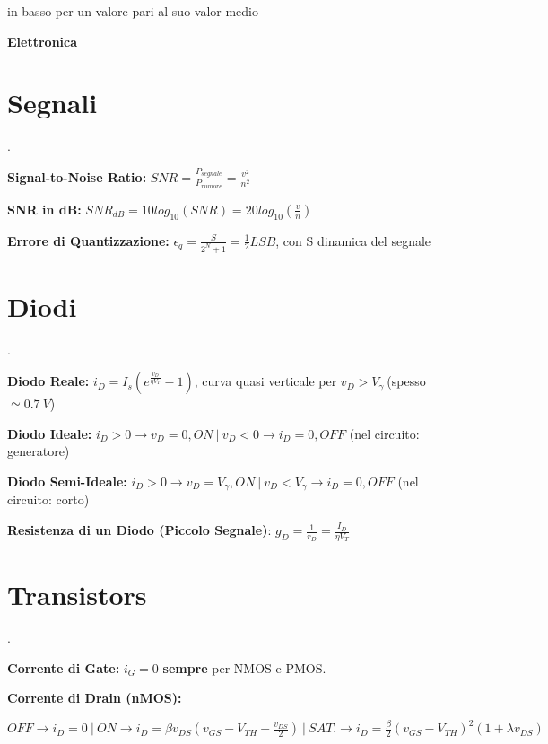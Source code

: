 \documentclass[12pt]{extarticle}
\begin{document}
in basso per un valore pari al suo valor medio


\newpage

{\bf \Huge Elettronica}
\setcounter{section}{0}
\section{Segnali}.


{\bf Signal-to-Noise Ratio:} $\displaystyle SNR = \frac{P_{segnale}}{P_{rumore}} = \frac{v^2}{n^2}$ 

{\bf SNR in dB:} $\displaystyle SNR_{dB} = 10log_{10}(SNR) = 20log_{10}(\frac{v}{n})$

{\bf Errore di Quantizzazione:} $\displaystyle \epsilon_q = \frac{S}{2^N+1} = \frac{1}{2}LSB $, con S dinamica del segnale

\section{Diodi}.

{\bf Diodo Reale:} $\displaystyle i_D = I_s(e^{\frac{v_D}{\eta V_T}}- 1)$, curva quasi verticale per $ v_D > V_\gamma \ $(spesso $\simeq 0.7 \ V $)$ $

{\bf Diodo Ideale:} $i_D > 0 \to v_D = 0, ON \ \big | \ v_D < 0 \to i_D = 0, OFF $ (nel circuito: generatore)

{\bf Diodo Semi-Ideale:} $i_D > 0 \to v_D = V_\gamma, ON \ \big | \ v_D < V_\gamma \to i_D = 0, OFF$ (nel circuito: corto)

{\bf Resistenza di un Diodo (Piccolo Segnale)}: $\displaystyle g_D = \frac{1}{r_D} = \frac{I_D}{\eta V_T}$

\section{Transistors}.

{\bf Corrente di Gate:} $i_G = 0$ {\bf sempre} per NMOS e PMOS.

{\bf Corrente di Drain (nMOS):} 

$\displaystyle OFF \to i_D = 0 \ \big | \  ON \to i_D = \beta v_{DS}(v_{GS}-V_{TH}-\frac{v_{DS}}{2}) \ \big | \ SAT. \to i_D = \frac{\beta}{2}(v_{GS}-V_{TH})^2(1+\lambda v_{DS})$
\end{document}
